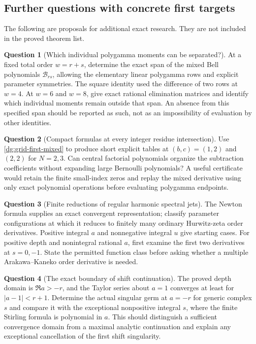 \documentclass[11pt,a4paper]{article}
\numberwithin{equation}{section}
\theoremstyle{definition}
\newtheorem{question}{Question}
\theoremstyle{remark}
\begin{document}
\subsection{Further questions with concrete first targets}

The following are proposals for additional exact research. They
are not included in the proved theorem list.

\begin{question}[Which individual polygamma moments can be separated?]
At a fixed total order $w=r+s$, determine the exact span of the
mixed Bell polynomials $\mathcal B_{rs}$, allowing the elementary
linear polygamma rows and explicit parameter symmetries. The
square identity used the difference of two rows at $w=4$.
At $w=6$ and $w=8$, give exact rational elimination matrices and
identify which individual moments remain outside that span.
An absence from this specified span should be reported as such,
not as an impossibility of evaluation by other identities.
\end{question}

\begin{question}[Compact formulas at every integer residue intersection]
Use \eqref{dg:grid-first-mixed} to produce short explicit
tables at $(b,c)=(1,2)$ and $(2,2)$ for $N=2,3$.
Can central factorial polynomials organize the subtraction
coefficients without expanding large Bernoulli polynomials?
A useful certificate would retain the finite small-index
zeros and replay the mixed derivative using only exact
polynomial operations before evaluating polygamma endpoints.
\end{question}

\begin{question}[Finite reductions of regular harmonic spectral jets]
The Newton formula supplies an exact convergent representation;
classify parameter configurations at which it reduces to finitely
many ordinary Hurwitz-zeta order derivatives. Positive integral
$a$ and nonnegative integral $u$ give starting cases. For
positive depth and nonintegral rational $a$, first examine the
first two derivatives at $s=0,-1$. State the permitted function
class before asking whether a multiple Arakawa--Kaneko order
derivative is needed.
\end{question}

\begin{question}[The exact boundary of shift continuation]
The proved depth domain is $\Re a>-r$, and the Taylor series
about $a=1$ converges at least for $|a-1|<r+1$.
Determine the actual singular germ at $a=-r$ for generic complex
$s$ and compare it with the exceptional nonpositive integral
$s$, where the finite Stirling formula is polynomial in $a$.
This should distinguish a sufficient convergence domain from
a maximal analytic continuation and explain any exceptional
cancellation of the first shift singularity.
\end{question}
\end{document}
